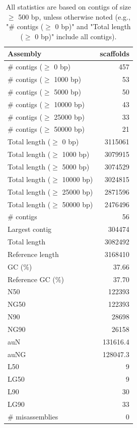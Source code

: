 \documentclass[12pt,a4paper]{article}
\begin{document}
\begin{table}[ht]
\begin{center}
\caption{All statistics are based on contigs of size $\geq$ 500 bp, unless otherwise noted (e.g., "\# contigs ($\geq$ 0 bp)" and "Total length ($\geq$ 0 bp)" include all contigs).}
\begin{tabular}{|l*{1}{|r}|}
\hline
Assembly & scaffolds \\ \hline
\# contigs ($\geq$ 0 bp) & 457 \\ \hline
\# contigs ($\geq$ 1000 bp) & 53 \\ \hline
\# contigs ($\geq$ 5000 bp) & 50 \\ \hline
\# contigs ($\geq$ 10000 bp) & 43 \\ \hline
\# contigs ($\geq$ 25000 bp) & 33 \\ \hline
\# contigs ($\geq$ 50000 bp) & 21 \\ \hline
Total length ($\geq$ 0 bp) & 3115061 \\ \hline
Total length ($\geq$ 1000 bp) & 3079915 \\ \hline
Total length ($\geq$ 5000 bp) & 3074529 \\ \hline
Total length ($\geq$ 10000 bp) & 3024815 \\ \hline
Total length ($\geq$ 25000 bp) & 2871596 \\ \hline
Total length ($\geq$ 50000 bp) & 2476496 \\ \hline
\# contigs & 56 \\ \hline
Largest contig & 304474 \\ \hline
Total length & 3082492 \\ \hline
Reference length & 3168410 \\ \hline
GC (\%) & 37.66 \\ \hline
Reference GC (\%) & 37.70 \\ \hline
N50 & 122393 \\ \hline
NG50 & 122393 \\ \hline
N90 & 28698 \\ \hline
NG90 & 26158 \\ \hline
auN & 131616.4 \\ \hline
auNG & 128047.3 \\ \hline
L50 & 9 \\ \hline
LG50 & 9 \\ \hline
L90 & 30 \\ \hline
LG90 & 33 \\ \hline
\# misassemblies & 0 \\ \hline

\end{tabular}
\end{center}
\end{table}
\end{document}
